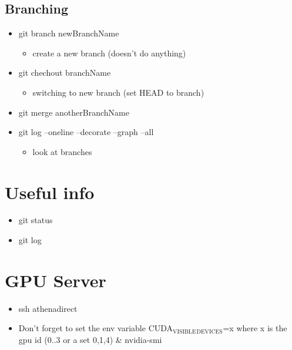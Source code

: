 \documentclass[11pt]{article}
\begin{document}
\subsection{Branching}
\label{sec:org2db9ed7}
\begin{itemize}
\item git branch newBranchName
\begin{itemize}
\item create a new branch (doesn't do anything)
\end{itemize}
\item git chechout branchName
\begin{itemize}
\item switching to new branch (set HEAD to branch)
\end{itemize}
\item git merge anotherBranchName
\item git log --oneline --decorate --graph --all
\begin{itemize}
\item look at branches
\end{itemize}
\end{itemize}

\section{Useful info}
\label{sec:org3eacc02}
\begin{itemize}
\item git status
\item git log
\end{itemize}

\section{GPU Server}
\label{sec:orge651fb2}
\begin{itemize}
\item ssh athenadirect
\item Don’t forget to set the env variable CUDA\(_{\text{VISIBLE}}\)\(_{\text{DEVICES}}\)=x where
x is the gpu id (0..3 or a set 0,1,4) \& nvidia-smi
\end{itemize}
\end{document}
